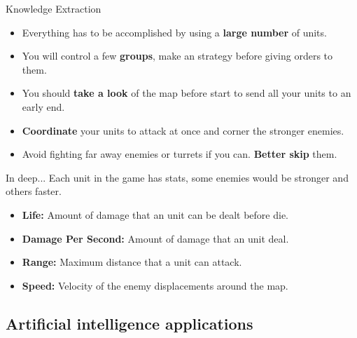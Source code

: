 \documentclass[10pt]{beamer}
\begin{document}
	  	\begin{frame}{Knowledge Extraction}
		  \begin{itemize}
		   \item Everything has to be accomplished by using a \textbf{large number} of units.
		    
		   \item You will control a few \textbf{groups}, make an strategy before giving orders to them.

		   \item You should \textbf{take a look} of the map before start to send all your units to an early end.

		   \item \textbf{Coordinate} your units to attack at once and corner the stronger enemies.

		   \item Avoid fighting far away enemies or turrets if you can. \textbf{Better skip} them.
		  \end{itemize}
		  
	  	\end{frame}

	  	\begin{frame}{In deep...}
		  Each unit in the game has stats, some enemies would be stronger and others faster.
		  \newline


		  \begin{itemize}
		   \item \textbf{Life:} Amount of damage that an unit can be dealt before die.
		   \item \textbf{Damage Per Second:} Amount of damage that an unit deal.
		   \item \textbf{Range:} Maximum distance that a unit can attack.
		   \item \textbf{Speed:} Velocity of the enemy displacements around the map.
		  \end{itemize}
	      \end{frame}

	    \subsection{Artificial intelligence applications}
\end{document}
